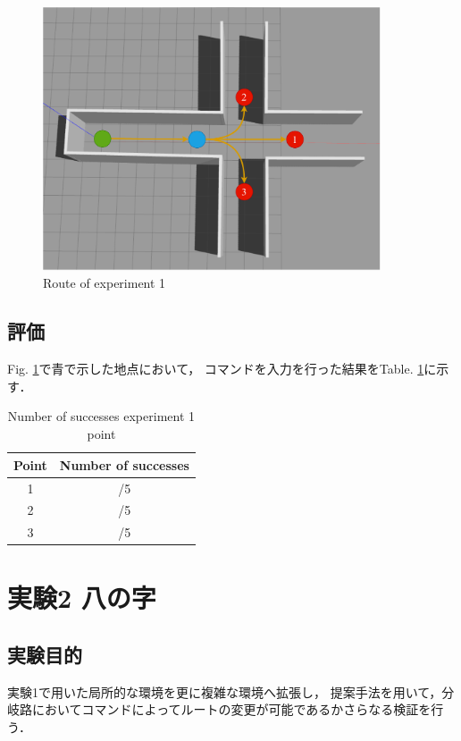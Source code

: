 \begin{figure}[ht]
    \centering
    \includegraphics[width = 10cm]{./figs/zyuziroute.pdf}
    \caption{Route of experiment 1}
    \label{fig::exp1route}
\end{figure}

\subsection{評価}

Fig. \ref{fig::exp1route}で青で示した地点において，
コマンドを入力を行った結果をTable. \ref{tb::exp1suc}に示す．
\begin{table}[H]
  \centering
  \caption{Number of successes experiment 1 point}
  \begin{tabular}{|c|c|}
  \hline
  Point & Number of successes \\ \hline
  1     & /5                  \\ \hline
  2     & /5                  \\ \hline
  3     & /5                  \\ \hline
  \end{tabular}
  
  \label{tb::exp1suc}
  \end{table}

\newpage
\section{実験2 八の字}
\subsection{実験目的}
実験1で用いた局所的な環境を更に複雑な環境へ拡張し，
提案手法を用いて，分岐路においてコマンドによってルートの変更が可能であるかさらなる検証を行う．
